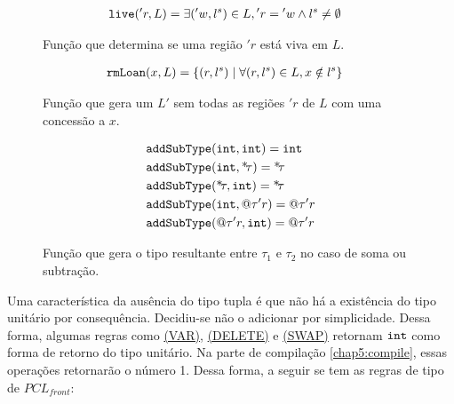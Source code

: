 \begin{figure}[ht]
	\caption{Função que determina se uma região $'r$ está viva em $L$.}
	\label{fig:def:live}
	\begin{align}
		&\texttt{live}('r, L) = \exists ('w, l^s) \in L, {'r} = {'w} \land l^s \neq \emptyset
	\end{align}
\end{figure}

\begin{figure}[ht]
	\caption{Função que gera um $L'$ sem todas as regiões $'r$ de $L$ com uma concessão a $x$.}
	\label{fig:def:rmloan}
	\begin{align}
		&\texttt{rmLoan}(x, L) = \{(r, l^s) \;|\; \forall (r, l^s) \in L, x \notin l^s \}
	\end{align}
\end{figure}

\begin{figure}[ht]
	\caption{Função que gera o tipo resultante entre $\tau_1$ e $\tau_2$ no caso de soma ou subtração.}
	\label{fig:def:addsub}
	\begin{align}
		&\texttt{addSubType}(\texttt{int}, \texttt{int}) = \texttt{int}\\ 
		&\texttt{addSubType}(\texttt{int}, \text{*}\!\tau) = \text{*}\!\tau\\ 
		&\texttt{addSubType}(\text{*}\!\tau, \texttt{int}) = \text{*}\!\tau\\ 
		&\texttt{addSubType}(\texttt{int}, @\tau'r) = @\tau'r\\ 
		&\texttt{addSubType}(@\tau'r, \texttt{int}) = @\tau'r
	\end{align}
\end{figure}

Uma característica da ausência do tipo tupla é que não há a existência do tipo unitário por consequência. Decidiu-se não o adicionar por simplicidade. Dessa forma, algumas regras como \hyperref[trule:var]{(VAR)}, \hyperref[trule:delete]{(DELETE)} e \hyperref[trule:swap]{(SWAP)} retornam $\texttt{int}$ como forma de retorno do tipo unitário. Na parte de compilação \ref{chap5:compile}, essas operações retornarão o número 1. Dessa forma, a seguir se tem as regras de tipo de $PCL_{front}$:



